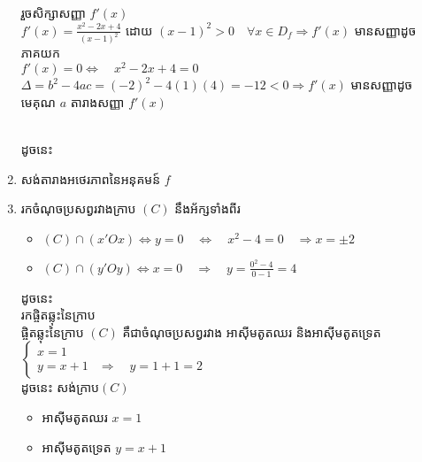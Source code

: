 \documentclass[expologarit]{subfiles}
\begin{document}
\begin{enumerate}[k]
 រួចសិក្សាសញ្ញា $f'(x)$ \\[0.25cm]
 $f'(x)=\frac{x^2-2x+4}{(x-1)^2}$  ដោយ $(x-1)^2>0\quad \forall x\in D_f\Rightarrow f'(x) $ មានសញ្ញាដូចភាគយក
 \\[0.25cm]
 $f'(x)=0\Leftrightarrow\quad x^2-2x+4=0$\\[0.25cm]
 $  \Delta =b^2-4ac=(-2)^2-4(1)(4)=-12<0\Rightarrow f'(x) $ មានសញ្ញាដូចមេគុណ $a$
 \newpage 
  តារាងសញ្ញា $f'(x)$		
\\[0.2cm]
	\\[0.25cm]
ដូចនេះ 
\item  សង់តារាងអថេរភាពនៃអនុគមន៍ $f$
\\[0.2cm]
\item រកចំណុចប្រសព្វរវាងក្រាប $(C)$ នឹងអ័ក្សទាំងពីរ
\begin{itemize}
\item $(C)\cap (x'Ox)\Leftrightarrow y=0 \quad \Leftrightarrow\quad x^2-4=0 \quad\Rightarrow x=\pm 2$ 
\item $(C)\cap (y'Oy)\Leftrightarrow x=0\quad \Rightarrow \quad  y=\frac{0^2-4}{0-1}=4$
\end{itemize}
ដូចនេះ \\[0.25cm]
 រកផ្ចិតឆ្លុះនៃក្រាប
 \\
 ផ្ចិតឆ្លុះនៃក្រាប $(C)$ គឹជាចំណុចប្រសព្វរវាង អាស៊ីមតូតឈរ និងអាស៊ីមតូតទ្រេត\\[0.25cm]
 $\left\{ \begin{array}{ll}
 x=1&\\
 y=x+1 & \Rightarrow \quad y=1+1=2
 \end{array}\right. $\\
 ដូចនេះ 
 \newpage 
សង់ក្រាប$(C)$
\begin{itemize}
\item អាស៊ីមតូតឈរ $x=1$
\item អាស៊ីមតូតទ្រេត $y=x+1$ \\[0.25cm]

\end{itemize}
\end{enumerate}
\end{document}
